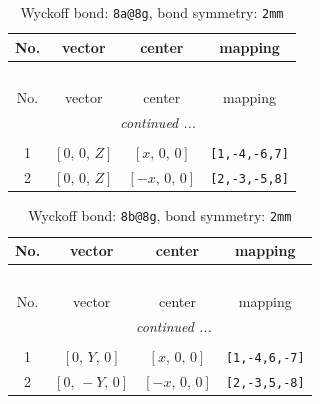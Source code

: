 \documentclass[fleqn,8pt]{jsarticle}
\begin{document}
\begin{longtable}{cccc}
\caption{Wyckoff bond: {\tt 8a@8g}, bond symmetry: {\tt 2mm}}
 \\
 \hline \hline
No. & vector & center & mapping \\ \hline \endfirsthead

\multicolumn{3}{l}{\tablename\ \thetable{}} \\
 \hline \hline
No. & vector & center & mapping \\ \hline \endhead

 \hline \hline
\multicolumn{3}{r}{\footnotesize\it continued ...} \\ \endfoot

 \hline \hline
\multicolumn{3}{r}{} \\ \endlastfoot

1 & $\left[ 0,\, 0,\, Z \right]$ & $\left[ x,\, 0,\, 0 \right]$ & {\tt [1,-4,-6,7]} \\ \hline
2 & $\left[ 0,\, 0,\, Z \right]$ & $\left[ - x,\, 0,\, 0 \right]$ & {\tt [2,-3,-5,8]} \\
\end{longtable}
\renewcommand{\arraystretch}{1.2}
\begin{longtable}{cccc}
\caption{Wyckoff bond: {\tt 8b@8g}, bond symmetry: {\tt 2mm}}
 \\
 \hline \hline
No. & vector & center & mapping \\ \hline \endfirsthead

\multicolumn{3}{l}{\tablename\ \thetable{}} \\
 \hline \hline
No. & vector & center & mapping \\ \hline \endhead

 \hline \hline
\multicolumn{3}{r}{\footnotesize\it continued ...} \\ \endfoot

 \hline \hline
\multicolumn{3}{r}{} \\ \endlastfoot

1 & $\left[ 0,\, Y,\, 0 \right]$ & $\left[ x,\, 0,\, 0 \right]$ & {\tt [1,-4,6,-7]} \\ \hline
2 & $\left[ 0,\, - Y,\, 0 \right]$ & $\left[ - x,\, 0,\, 0 \right]$ & {\tt [2,-3,5,-8]} \\
\end{longtable}
\renewcommand{\arraystretch}{1.2}
\end{document}
